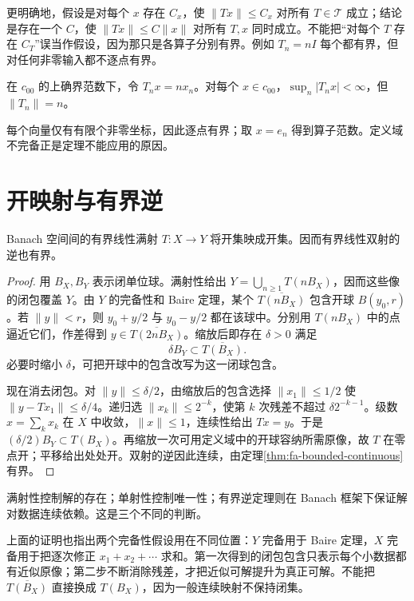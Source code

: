 更明确地，假设是对每个 $x$ 存在 $C_x$，使 $\|Tx\|\leq C_x$ 对所有 $T\in\mathcal T$ 成立；结论是存在一个 $C$，使 $\|Tx\|\leq C\|x\|$ 对所有 $T,x$ 同时成立。不能把“对每个 $T$ 存在 $C_T$”误当作假设，因为那只是各算子分别有界。例如 $T_n=nI$ 每个都有界，但对任何非零输入都不逐点有界。

\begin{example}[缺少完备性时]
在 $c_{00}$ 的上确界范数下，令 $T_nx=nx_n$。对每个 $x\in c_{00}$，$\sup_n|T_nx|<\infty$，但 $\|T_n\|=n$。
\end{example}
每个向量仅有有限个非零坐标，因此逐点有界；取 $x=e_n$ 得到算子范数。定义域不完备正是定理不能应用的原因。

\section{开映射与有界逆}
\begin{theorem}[开映射定理]\label{thm:fa-open-mapping}
Banach 空间间的有界线性满射 $T:X\to Y$ 将开集映成开集。因而有界线性双射的逆也有界。
\end{theorem}
\begin{proof}
用 $B_X,B_Y$ 表示闭单位球。满射性给出 $Y=\bigcup_{n\geq1}T(nB_X)$，因而这些像的闭包覆盖 $Y$。由 $Y$ 的完备性和 Baire 定理，某个 $\overline{T(nB_X)}$ 包含开球 $B(y_0,r)$。若 $\|y\|<r$，则 $y_0+y/2$ 与 $y_0-y/2$ 都在该球中。分别用 $T(nB_X)$ 中的点逼近它们，作差得到 $y\in\overline{T(2nB_X)}$。缩放后即存在 $\delta>0$ 满足
\[
 \delta B_Y\subset\overline{T(B_X)}.
\]
必要时缩小 $\delta$，可把开球中的包含改写为这一闭球包含。

现在消去闭包。对 $\|y\|\leq\delta/2$，由缩放后的包含选择 $\|x_1\|\leq1/2$ 使 $\|y-Tx_1\|\leq\delta/4$。递归选 $\|x_k\|\leq2^{-k}$，使第 $k$ 次残差不超过 $\delta2^{-k-1}$。级数 $x=\sum_kx_k$ 在 $X$ 中收敛，$\|x\|\leq1$，连续性给出 $Tx=y$。于是 $(\delta/2)B_Y\subset T(B_X)$。再缩放一次可用定义域中的开球容纳所需原像，故 $T$ 在零点开；平移给出处处开。双射的逆因此连续，由定理\ref{thm:fa-bounded-continuous}有界。
\end{proof}
满射性控制解的存在；单射性控制唯一性；有界逆定理则在 Banach 框架下保证解对数据连续依赖。这是三个不同的判断。

上面的证明也指出两个完备性假设用在不同位置：$Y$ 完备用于 Baire 定理，$X$ 完备用于把逐次修正 $x_1+x_2+\cdots$ 求和。第一次得到的闭包包含只表示每个小数据都有近似原像；第二步不断消除残差，才把近似可解提升为真正可解。不能把 $\overline{T(B_X)}$ 直接换成 $T(B_X)$，因为一般连续映射不保持闭集。

